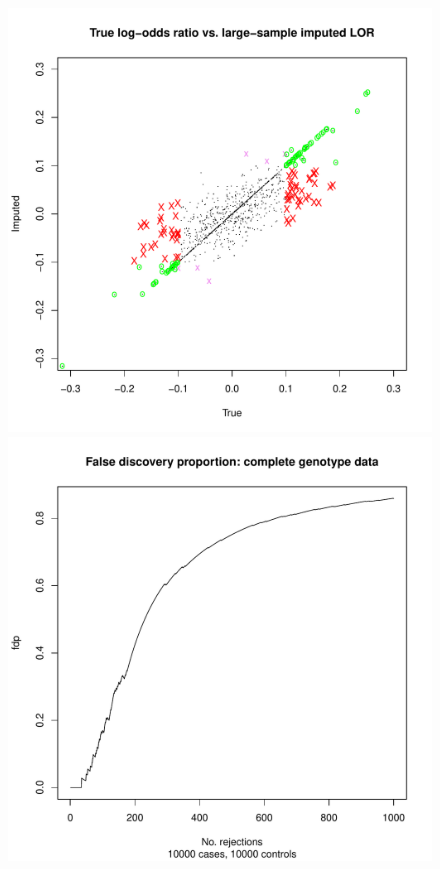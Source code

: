 \documentclass[12pt]{article}
\begin{document}
\begin{figure}[h]
\centering
\includegraphics[scale=0.25]{impute_g4.pdf}
\includegraphics[scale=0.25]{impute_g5.pdf}

\end{figure}
\end{document}
